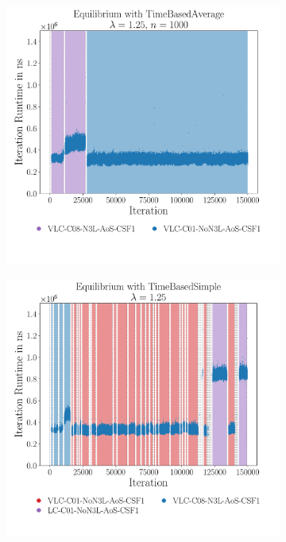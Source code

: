 \begin{figure}[htpb]
	\begin{subfigure}[t]{0.5\textwidth}
		\vskip 0pt
		\centering
		\includegraphics[width=\textwidth]{./Figures/plots/equilibrium_configs_good.pdf}
		\vspace*{-1cm}
	\end{subfigure}%
	\begin{subfigure}[t]{0.5\textwidth}
		\vskip 0pt
		\centering
		\includegraphics[width=\textwidth]{./Figures/plots/equilibrium_configs_bad.pdf}

\end{subfigure}
\end{figure}
